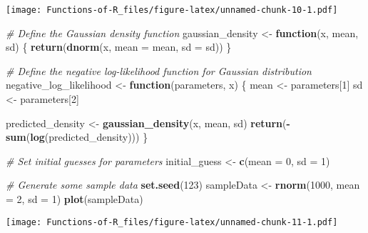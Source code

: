 \documentclass[
]{article}
\newenvironment{Shaded}{\begin{snugshade}}{\end{snugshade}}
\newcommand{\AttributeTok}[1]{\textcolor[rgb]{0.13,0.29,0.53}{#1}}
\newcommand{\CommentTok}[1]{\textcolor[rgb]{0.56,0.35,0.01}{\textit{#1}}}
\newcommand{\ControlFlowTok}[1]{\textcolor[rgb]{0.13,0.29,0.53}{\textbf{#1}}}
\newcommand{\DecValTok}[1]{\textcolor[rgb]{0.00,0.00,0.81}{#1}}
\newcommand{\FunctionTok}[1]{\textcolor[rgb]{0.13,0.29,0.53}{\textbf{#1}}}
\newcommand{\NormalTok}[1]{#1}
\newcommand{\OtherTok}[1]{\textcolor[rgb]{0.56,0.35,0.01}{#1}}
\newcommand{\SpecialCharTok}[1]{\textcolor[rgb]{0.81,0.36,0.00}{\textbf{#1}}}
\newcommand{\StringTok}[1]{\textcolor[rgb]{0.31,0.60,0.02}{#1}}
\begin{document}
\texttt{[image: Functions-of-R\_files/figure-latex/unnamed-chunk-10-1.pdf]}

\begin{Shaded}
\begin{Highlighting}[]
\CommentTok{\# Define the Gaussian density function}
\NormalTok{gaussian\_density }\OtherTok{\textless{}{-}} \ControlFlowTok{function}\NormalTok{(x, mean, sd) \{}
  \FunctionTok{return}\NormalTok{(}\FunctionTok{dnorm}\NormalTok{(x, }\AttributeTok{mean =}\NormalTok{ mean, }\AttributeTok{sd =}\NormalTok{ sd))}
\NormalTok{\}}

\CommentTok{\# Define the negative log{-}likelihood function for Gaussian distribution}
\NormalTok{negative\_log\_likelihood }\OtherTok{\textless{}{-}} \ControlFlowTok{function}\NormalTok{(parameters, x) \{}
\NormalTok{  mean }\OtherTok{\textless{}{-}}\NormalTok{ parameters[}\DecValTok{1}\NormalTok{]}
\NormalTok{  sd }\OtherTok{\textless{}{-}}\NormalTok{ parameters[}\DecValTok{2}\NormalTok{]}
  
\NormalTok{  predicted\_density }\OtherTok{\textless{}{-}} \FunctionTok{gaussian\_density}\NormalTok{(x, mean, sd)}
  \FunctionTok{return}\NormalTok{(}\SpecialCharTok{{-}}\FunctionTok{sum}\NormalTok{(}\FunctionTok{log}\NormalTok{(predicted\_density)))}
\NormalTok{\}}

\CommentTok{\# Set initial guesses for parameters}
\NormalTok{initial\_guess }\OtherTok{\textless{}{-}} \FunctionTok{c}\NormalTok{(}\AttributeTok{mean =} \DecValTok{0}\NormalTok{, }\AttributeTok{sd =} \DecValTok{1}\NormalTok{)}

\CommentTok{\# Generate some sample data}
\FunctionTok{set.seed}\NormalTok{(}\DecValTok{123}\NormalTok{)}
\NormalTok{sampleData }\OtherTok{\textless{}{-}} \FunctionTok{rnorm}\NormalTok{(}\DecValTok{1000}\NormalTok{, }\AttributeTok{mean =} \DecValTok{2}\NormalTok{, }\AttributeTok{sd =} \DecValTok{1}\NormalTok{)}
\FunctionTok{plot}\NormalTok{(sampleData)}
\end{Highlighting}
\end{Shaded}

\texttt{[image: Functions-of-R\_files/figure-latex/unnamed-chunk-11-1.pdf]}

\begin{Shaded}
\end{Shaded}
\end{document}
